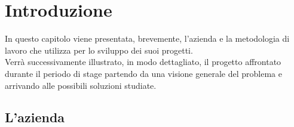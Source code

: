 
\chapter{Introduzione}
\label{cap:introduzione}
In questo capitolo viene presentata, brevemente, l'azienda e la metodologia di lavoro che utilizza per lo sviluppo dei suoi progetti.\\
Verrà successivamente illustrato, in modo dettagliato, il progetto affrontato durante il periodo di stage partendo da una visione generale del problema e arrivando alle possibili soluzioni studiate.

\section{L'azienda}
